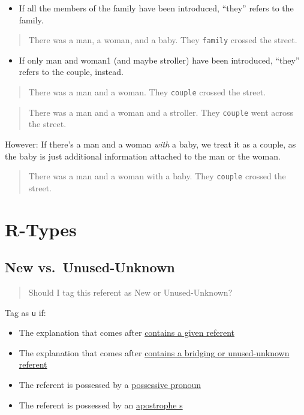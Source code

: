 \documentclass[
]{book}
\providecommand{\tightlist}{%
  \setlength{\itemsep}{0pt}\setlength{\parskip}{0pt}}
\begin{document}
\begin{itemize}
\tightlist
\item
  If all the members of the family have been introduced,
  ``they'' refers to the family.
\end{itemize}

\begin{quote}
There was a man, a woman, and a baby.
They \texttt{family} crossed the street.
\end{quote}

\begin{itemize}
\tightlist
\item
  If only man and woman1 (and maybe stroller) have been introduced,
  ``they'' refers to the couple, instead.
\end{itemize}

\begin{quote}
There was a man and a woman.
They \texttt{couple} crossed the street.
\end{quote}

\begin{quote}
There was a man and a woman and a stroller.
They \texttt{couple} went across the street.
\end{quote}

However: If there's a man and a woman \emph{with} a baby,
we treat it as a couple,
as the baby is just additional information
attached to the man or the woman.

\begin{quote}
There was a man and a woman with a baby.
They \texttt{couple} crossed the street.
\end{quote}

\hypertarget{r-types}{%
\section{R-Types}\label{r-types}}

\hypertarget{new-vs.-unused-unknown}{%
\subsection{New vs.~Unused-Unknown}\label{new-vs.-unused-unknown}}

\begin{quote}
Should I tag this referent as New or Unused-Unknown?
\end{quote}

Tag as \texttt{u} if:

\begin{itemize}
\tightlist
\item
  The explanation that comes after \protect\hyperlink{explanation-given-referent}{contains a given referent}
\item
  The explanation that comes after \protect\hyperlink{explanation-bridging-or-unused-unknown-referent}{contains a bridging or unused-unknown referent}
\item
  The referent is possessed by a \protect\hyperlink{possessive-pronouns}{possessive pronoun}
\item
  The referent is possessed by an \protect\hyperlink{apostrophe-s}{apostrophe s}
\end{itemize}
\end{document}
